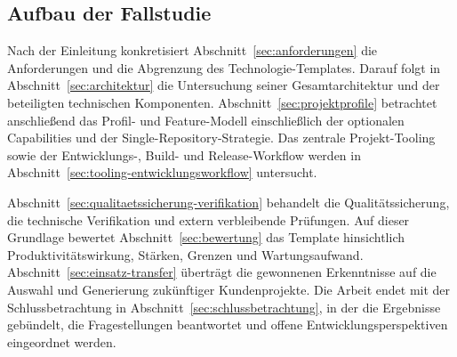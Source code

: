\subsection{Aufbau der Fallstudie}
\label{subsec:aufbau-der-fallstudie}

Nach der Einleitung konkretisiert Abschnitt~\ref{sec:anforderungen} die
Anforderungen und die Abgrenzung des Technologie-Templates. Darauf folgt in
Abschnitt~\ref{sec:architektur} die Untersuchung seiner Gesamtarchitektur und
der beteiligten technischen Komponenten. Abschnitt~\ref{sec:projektprofile}
betrachtet anschließend das Profil- und Feature-Modell einschließlich der
optionalen Capabilities und der Single-Repository-Strategie. Das zentrale
Projekt-Tooling sowie der Entwicklungs-, Build- und Release-Workflow werden in
Abschnitt~\ref{sec:tooling-entwicklungsworkflow} untersucht.

Abschnitt~\ref{sec:qualitaetssicherung-verifikation} behandelt die
Qualitätssicherung, die technische Verifikation und extern verbleibende
Prüfungen. Auf dieser Grundlage bewertet Abschnitt~\ref{sec:bewertung} das
Template hinsichtlich Produktivitätswirkung, Stärken, Grenzen und
Wartungsaufwand. Abschnitt~\ref{sec:einsatz-transfer} überträgt die gewonnenen
Erkenntnisse auf die Auswahl und Generierung zukünftiger Kundenprojekte. Die
Arbeit endet mit der Schlussbetrachtung in
Abschnitt~\ref{sec:schlussbetrachtung}, in der die Ergebnisse gebündelt, die
Fragestellungen beantwortet und offene Entwicklungsperspektiven eingeordnet
werden.
